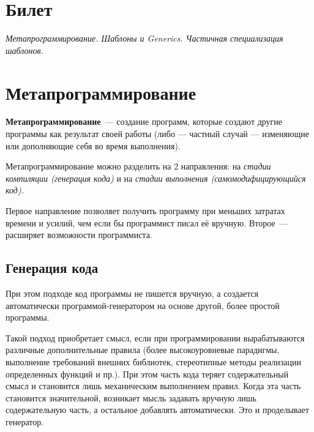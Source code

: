 \documentclass[a4paper,10pt]{article}
\begin{document}
\lstset{language=C++,inputencoding=utf8}

\section*{Билет }
{\em Метапрограммирование. Шаблоны и Generics. 
Частичная специализация шаблонов.}

\section{Метапрограммирование} 
{\bf Метапрограммирование}~--- создание программ, которые создают другие программы как результат своей работы (либо — частный случай —
изменяющие или дополняющие себя во время выполнения).

Метапрограммирование можно разделить на 2 направления: на {\it стадии компиляции (генерация кода)} и на {\it стадии выполнения
(самомодифицирующийся код).}

Первое направление позволяет получить программу при меньших затратах времени и усилий, чем если бы программист писал её вручную. Второе~---
расширяет возможности программиста.

\subsection{Генерация кода}

При этом подходе код программы не пишется вручную, а создается автоматически программой-ге\-не\-ра\-то\-ром на основе другой, более простой
программы.

Такой подход приобретает смысл, если при программировании вырабатываются различные дополнительные правила (более высокоуровневые парадигмы,
выполнение требований внешних библиотек, стереотипные методы реализации определенных функций и пр.). При этом часть кода теряет
содержательный смысл и становится лишь механическим выполнением правил. Когда эта часть становится значительной, возникает мысль задавать
вручную лишь содержательную часть, а остальное добавлять автоматически. Это и проделывает генератор.
\end{document}

